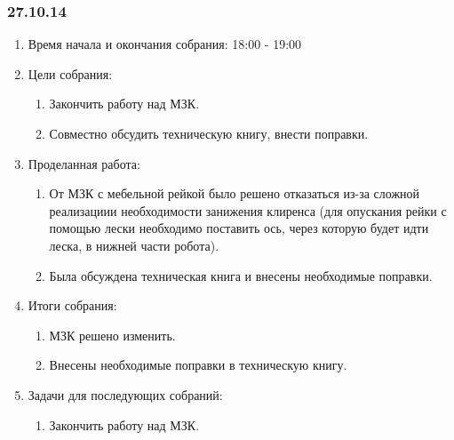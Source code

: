 	
\subsubsection{27.10.14}

\begin{enumerate}
	\item Время начала и окончания собрания:
	18:00 - 19:00
	\item Цели собрания:
	\begin{enumerate}
	  \item Закончить работу над МЗК.
	  
	  \item Совместно обсудить техническую книгу, внести поправки.
	  
    \end{enumerate}
    
	\item Проделанная работа:
	\begin{enumerate}
	  \item От МЗК с мебельной рейкой было решено отказаться из-за сложной реализациии необходимости занижения клиренса (для опускания рейки с помощью лески необходимо поставить ось, через которую будет идти леска, в нижней части робота).
      
      \item Была обсуждена техническая книга и внесены необходимые поправки.
      
    \end{enumerate}
    
	\item Итоги собрания: 
	\begin{enumerate}
	  \item МЗК решено изменить.
	  
	  \item Внесены необходимые поправки в техническую книгу.
      
    \end{enumerate}
    
	\item Задачи для последующих собраний:
	\begin{enumerate}
	  \item Закончить работу над МЗК.
	  
    \end{enumerate}     
\end{enumerate}
\fillpage
